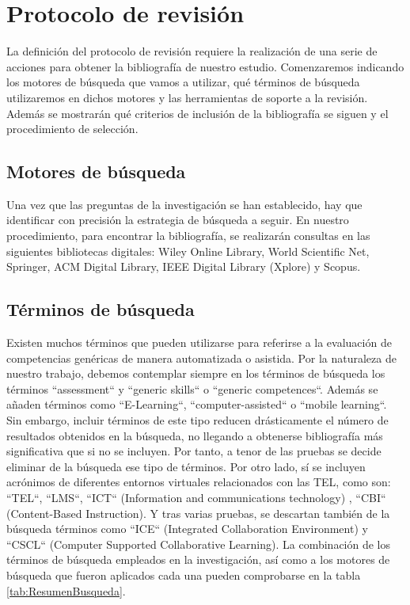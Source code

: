 \section{Protocolo de revisión}

La definición del protocolo de revisión requiere la realización de una serie de acciones para obtener la bibliografía de nuestro estudio. Comenzaremos indicando los motores de búsqueda que vamos a utilizar, qué términos de búsqueda utilizaremos en dichos motores y las herramientas de soporte a la revisión. Además se mostrarán qué criterios de inclusión de la bibliografía se siguen y el procedimiento de selección.

\subsection{Motores de búsqueda}
Una vez que las preguntas de la investigación se han establecido, hay que identificar con precisión la estrategia de búsqueda a seguir. En nuestro procedimiento, para encontrar la bibliografía, se realizarán consultas en las siguientes bibliotecas digitales: Wiley Online Library, World Scientific Net, Springer, ACM Digital Library, IEEE Digital Library (Xplore) y Scopus.

\subsection{Términos de búsqueda}
\label{sec:TerminosBusqueda}
Existen muchos términos que pueden utilizarse para referirse a la evaluación de competencias genéricas de manera automatizada o asistida. Por la naturaleza de nuestro trabajo, debemos contemplar siempre en los términos de búsqueda los términos ``assessment`` y ``generic skills`` o ``generic competences``. Además se añaden términos como  ``E-Learning``, ``computer-assisted`` o ``mobile learning``. Sin embargo, incluir términos de este tipo reducen drásticamente el número de resultados obtenidos en la búsqueda, no llegando a obtenerse bibliografía más significativa que si no se incluyen. Por tanto, a tenor de las pruebas se decide eliminar de la búsqueda ese tipo de términos. Por otro lado, sí se incluyen acrónimos de diferentes entornos virtuales relacionados con las TEL, como son: ``TEL``, ``LMS``, ``ICT`` (Information and communications technology) , ``CBI`` (Content-Based Instruction). Y tras varias pruebas, se descartan también de la búsqueda términos como ``ICE`` (Integrated Collaboration Environment) y ``CSCL`` (Computer Supported Collaborative Learning). La combinación de los términos de búsqueda empleados en la investigación, así como a los motores de búsqueda que fueron aplicados cada una pueden comprobarse en la tabla \ref{tab:ResumenBusqueda}.

